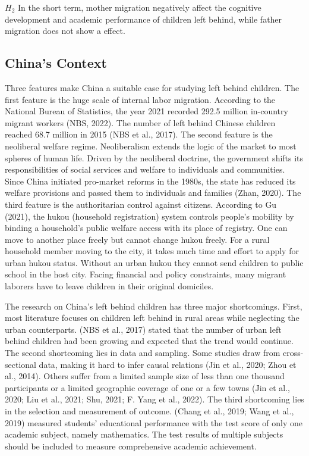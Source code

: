 \documentclass[
  man,floatsintext]{apa7}
\begin{document}
\(H_2\) In the short term, mother migration negatively affect the cognitive development and academic performance of children left behind, while father migration does not show a effect.

\hypertarget{chinas-context}{%
\subsection{China's Context}\label{chinas-context}}

Three features make China a suitable case for studying left behind children. The first feature is the huge scale of internal labor migration. According to the National Bureau of Statistics, the year 2021 recorded 292.5 million in-country migrant workers (NBS, 2022). The number of left behind Chinese children reached 68.7 million in 2015 (NBS et al., 2017). The second feature is the neoliberal welfare regime. Neoliberalism extends the logic of the market to most spheres of human life. Driven by the neoliberal doctrine, the government shifts its responsibilities of social services and welfare to individuals and communities. Since China initiated pro-market reforms in the 1980s, the state has reduced its welfare provisions and passed them to individuals and families (Zhan, 2020). The third feature is the authoritarian control against citizens. According to Gu (2021), the hukou (household registration) system controls people's mobility by binding a household's public welfare access with its place of registry. One can move to another place freely but cannot change hukou freely. For a rural household member moving to the city, it takes much time and effort to apply for urban hukou status. Without an urban hukou they cannot send children to public school in the host city. Facing financial and policy constraints, many migrant laborers have to leave children in their original domiciles.

The research on China's left behind children has three major shortcomings. First, most literature focuses on children left behind in rural areas while neglecting the urban counterparts. (NBS et al., 2017) stated that the number of urban left behind children had been growing and expected that the trend would continue. The second shortcoming lies in data and sampling. Some studies draw from cross-sectional data, making it hard to infer causal relations (Jin et al., 2020; Zhou et al., 2014). Others suffer from a limited sample size of less than one thousand participants or a limited geographic coverage of one or a few towns (Jin et al., 2020; Liu et al., 2021; Shu, 2021; F. Yang et al., 2022). The third shortcoming lies in the selection and measurement of outcome. (Chang et al., 2019; Wang et al., 2019) measured students' educational performance with the test score of only one academic subject, namely mathematics. The test results of multiple subjects should be included to measure comprehensive academic achievement.
\end{document}
